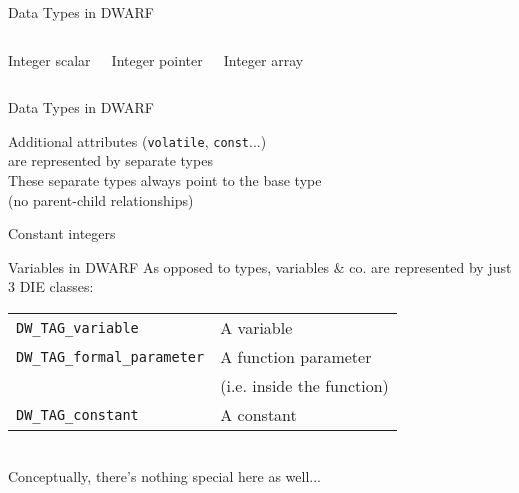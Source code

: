 \begin{frame}{Data Types in DWARF}
\begin{columns}

\begin{block}{Integer scalar}
\end{block}
\begin{block}{Integer pointer}
\end{block}

\begin{block}{Integer array}
\end{block}

\end{columns}
\end{frame}


\begin{frame}{Data Types in DWARF}
\begin{centering}
Additional attributes (\texttt{volatile}, \texttt{const}...)\\
are represented by separate types\\
\medskip
These separate types always point to the base type\\
(no parent-child relationships)\\
\end{centering}
\medskip
\begin{block}{Constant integers}
\end{block}
\end{frame}


\begin{frame}{Variables in DWARF}
As opposed to types, \alert{variables} \& co. are represented by just 3 DIE classes:\\
\medskip
\begin{tabular}{ l l }
\texttt{DW\_TAG\_variable} & A variable \\
\texttt{DW\_TAG\_formal\_parameter} & A function parameter \\
	& (i.e. inside the function) \\
\texttt{DW\_TAG\_constant} & A constant \\
\end{tabular}\\
\bigskip
Conceptually, there's nothing special here as well...
\end{frame}


